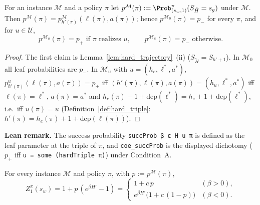 \begin{lemma}\label{lem:hard_success}
\leanok
For an instance $\mathcal M$ and a policy $\pi$ let
$p^{\mathcal M}(\pi) := \Prob^{\pi}_{(s_w,1)}(S_{\tilde H} = s_g)$ under $\mathcal M$. Then
$p^{\mathcal M}(\pi) = p^{\mathcal M}_{h'(\pi)}(\ell(\pi), a(\pi))$; hence
$p^{\mathcal M_0}(\pi) = p_-$ for every $\pi$, and for $u \in \mathcal U$,
\[
  p^{\mathcal M_u}(\pi) = p_+ \text{ if } \pi \text{ realizes } u, \qquad p^{\mathcal M_u}(\pi) = p_- \text{ otherwise.}
\]
\end{lemma}

\begin{proof}
\leanok
{}
The first claim is Lemma~\ref{lem:hard_trajectory}~(ii) ($S_{\tilde H} = S_{h'+1}$). In
$\mathcal M_0$ all leaf probabilities are $p_-$. In $\mathcal M_u$ with $u = (h_e, \ell^*, a^*)$,
$p^{u}_{h'(\pi)}(\ell(\pi), a(\pi)) = p_+$ iff $(h'(\pi), \ell(\pi), a(\pi)) = (h_u, \ell^*, a^*)$ iff
$\ell(\pi) = \ell^*$, $a(\pi) = a^*$ and $h_e(\pi) + 1 + \mathrm{dep}(\ell^*) = h_e + 1 + \mathrm{dep}(\ell^*)$,
i.e.\ iff $u(\pi) = u$ (Definition~\ref{def:hard_triple}: $h'(\pi) = h_e(\pi) + 1 + \mathrm{dep}(\ell(\pi))$).
\end{proof}

\textbf{Lean remark.} The success probability \texttt{succProb β ε H u π} is defined as the leaf parameter
at the triple of $\pi$, and \texttt{coe\_succProb} is the displayed dichotomy
($p_+$ iff \texttt{u = some (hardTriple π)}) under Condition~A.

\begin{lemma}\label{lem:hard_exp_value}
\leanok
For every instance $\mathcal M$ and policy $\pi$, with $p := p^{\mathcal M}(\pi)$,
\[
  Z^\pi_1(s_w) = 1 + p\,(e^{\beta H'} - 1) = \begin{cases} 1 + c\,p & (\beta > 0), \\ e^{\beta H'}\big(1 + c\,(1 - p)\big) & (\beta < 0). \end{cases}
\]
\end{lemma}

